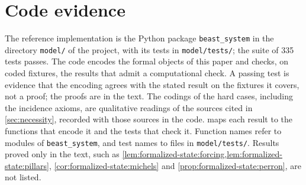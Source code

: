 \documentclass[11pt,letterpaper]{article}
\theoremstyle{definition}
\theoremstyle{remark}
\begin{document}
\appendix

\section{Code evidence}
\label{app:code}

The reference implementation is the Python package \texttt{beast\_system} in the directory \texttt{model/} of the project, with its tests in \texttt{model/tests/}; the suite of 335 tests passes. The code encodes the formal objects of this paper and checks, on coded fixtures, the results that admit a computational check. A passing test is evidence that the encoding agrees with the stated result on the fixtures it covers, not a proof; the proofs are in the text. The codings of the hard cases, including the incidence axioms, are qualitative readings of the sources cited in \cref{sec:necessity}, recorded with those sources in the code.  maps each result to the functions that encode it and the tests that check it. Function names refer to modules of \texttt{beast\_system}, and test names to files in \texttt{model/tests/}. Results proved only in the text, such as \cref{lem:formalized-state:forcing,lem:formalized-state:pillars}, \cref{cor:formalized-state:michels} and \cref{prop:formalized-state:perron}, are not listed.
\end{document}
